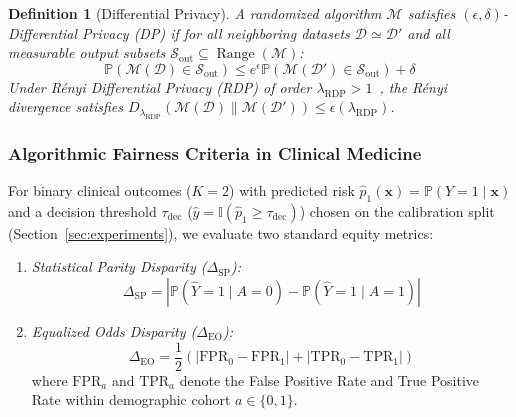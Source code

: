 \documentclass[pdflatex,sn-vancouver-num,referee,lineno]{sn-jnl}
\theoremstyle{thmstyleone}
\theoremstyle{thmstylethree}
\newtheorem{definition}{Definition}
\begin{document}
\begin{definition}[Differential Privacy]
A randomized algorithm $\mathcal{M}$ satisfies $(\epsilon, \delta)$-Differential Privacy (DP) if for all neighboring datasets $\mathcal{D} \simeq \mathcal{D}'$ and all measurable output subsets $\mathcal{S}_{\text{out}} \subseteq \operatorname{Range}(\mathcal{M})$:
\begin{equation}
    \mathbb{P}(\mathcal{M}(\mathcal{D}) \in \mathcal{S}_{\text{out}}) \le e^\epsilon \mathbb{P}(\mathcal{M}(\mathcal{D}') \in \mathcal{S}_{\text{out}}) + \delta
\end{equation}
Under Rényi Differential Privacy (RDP) of order $\lambda_{\text{RDP}} > 1$~\cite{mironov2017renyi}, the Rényi divergence satisfies $D_{\lambda_{\text{RDP}}}(\mathcal{M}(\mathcal{D}) \parallel \mathcal{M}(\mathcal{D}')) \le \epsilon(\lambda_{\text{RDP}})$.
\end{definition}

\subsubsection{Algorithmic Fairness Criteria in Clinical Medicine}
For binary clinical outcomes ($K=2$) with predicted risk $\hat{p}_1(\mathbf{x}) = \mathbb{P}(Y=1 \mid \mathbf{x})$ and a decision threshold $\tau_{\text{dec}}$ ($\hat{y} = \mathbb{I}(\hat{p}_1 \ge \tau_{\text{dec}})$) chosen on the calibration split (Section~\ref{sec:experiments}), we evaluate two standard equity metrics:
\begin{enumerate}
    \item \emph{Statistical Parity Disparity ($\Delta_{\text{SP}}$):}
    \begin{equation}
        \Delta_{\text{SP}} = |\mathbb{P}(\hat{Y} = 1 \mid A = 0) - \mathbb{P}(\hat{Y} = 1 \mid A = 1)|
    \end{equation}
    \item \emph{Equalized Odds Disparity ($\Delta_{\text{EO}}$):}
    \begin{equation}
        \Delta_{\text{EO}} = \frac{1}{2} \left( |\text{FPR}_0 - \text{FPR}_1| + |\text{TPR}_0 - \text{TPR}_1| \right)
    \end{equation}
    where $\text{FPR}_a$ and $\text{TPR}_a$ denote the False Positive Rate and True Positive Rate within demographic cohort $a \in \{0, 1\}$.
\end{enumerate}
\end{document}
